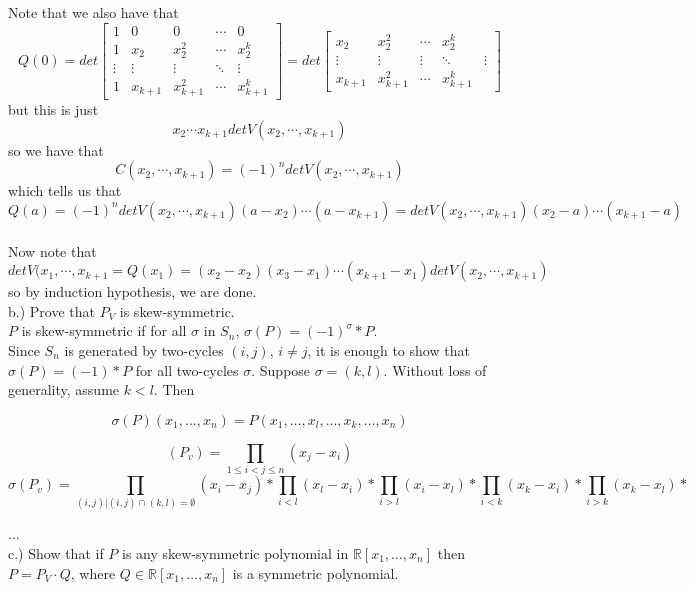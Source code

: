 \documentclass[12pt]{article}
\begin{document}
Note that we also have that
$$ Q(0) = det \begin{bmatrix} 1 & 0 & 0 & \cdots & 0 \\ 1 &x_2 & x_2^2 & \cdots & x_2^{k} \\ \vdots & \vdots & \vdots & \ddots & \vdots \\ 1 &x_{k+1} & x_{k+1}^2 & \cdots & x_{k+1}^{k} \end{bmatrix} = det \begin{bmatrix}  x_2 & x_2^2 & \cdots & x_2^{k} \\ \vdots & \vdots & \vdots & \ddots & \vdots \\ x_{k+1} & x_{k+1}^2 & \cdots & x_{k+1}^{k} \end{bmatrix}$$
but this is just
$$x_2 \cdots x_{k+1} det V(x_2, \cdots , x_{k+1})$$
so we have that
$$C(x_2, \cdots, x_{k+1}) = (-1)^n det V(x_2, \cdots , x_{k+1})$$
which tells us that
$$Q(a) = (-1)^n det V(x_2, \cdots , x_{k+1}) (a - x_2) \cdots (a - x_{k+1}) = det V(x_2, \cdots , x_{k+1}) (x_2 - a) \cdots (x_{k+1} - a)$$\\

Now note that 
$$det V(x_1, \cdots, x_{k+1} = Q(x_1) = (x_2 - x_2)(x_3 - x_1) \cdots (x_{k+1} - x_1) det V(x_2, \cdots, x_{k+1})$$
so by induction hypothesis, we are done. \\

b.) Prove that $P_V$ is skew-symmetric. \\

$P$ is skew-symmetric if for all $\sigma$ in $S_n$,
$\sigma(P) = (-1)^\sigma * P$. \\

Since $S_n$ is generated by two-cycles $(i, j)$, $i \neq j$, it is enough to show that $\sigma(P) = (-1) * P$ for all two-cycles $\sigma$. Suppose $\sigma = (k, l)$. Without loss of generality, assume $k < l$. Then

$$\sigma(P)(x_1, ..., x_n) = P(x_1, ..., x_l, ..., x_k, ..., x_n)$$

$$(P_v) =  \prod_{1\leq i < j \leq n} (x_j - x_i)$$
$$\sigma(P_v) = \prod_{(i, j) | (i, j) \cap (k, l) = \emptyset} (x_i - x_j)*
\prod_{i < l} (x_l - x_i) * \prod_{i > l} (x_i - x_l)* \prod_{i < k} (x_k - x_i) * \prod_{i > k} (x_k - x_l)*$$

...\\

c.) Show that if $P$ is any skew-symmetric polynomial in $\mathbb{R}[x_1, \dots, x_n]$ then $P = P_V \cdot Q$, where $Q \in \mathbb{R}[x_1, \dots, x_n]$ is a symmetric polynomial.\\
\end{document}

